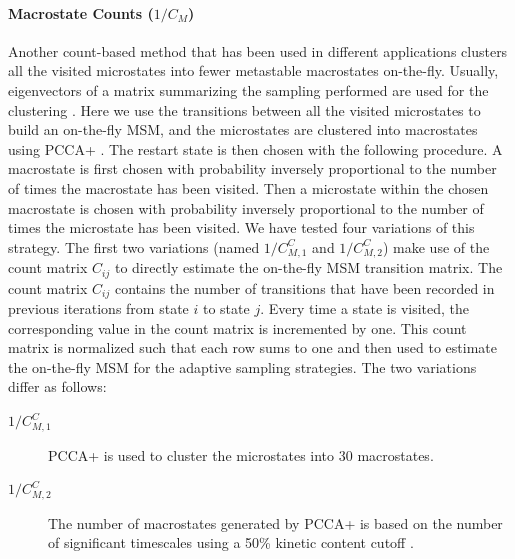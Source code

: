 \paragraph{Macrostate Counts ($1/C_M$)} 
Another count-based method that has been used in different applications clusters all the
visited microstates into fewer metastable macrostates on-the-fly. Usually, eigenvectors of
a matrix summarizing the sampling performed are used for the clustering
\cite{preto2014fast, doerr2016htmd}.  Here we use the transitions between all
the visited microstates to build an on-the-fly MSM, and the microstates are
clustered into macrostates using PCCA+ \cite{roblitz2013fuzzy}. 
The restart state is then chosen with the following procedure. A macrostate
is first chosen with probability inversely proportional to the number of times
the macrostate has been visited. Then a microstate within the chosen macrostate
is chosen with probability inversely proportional to the number of times the
microstate has been visited. We have tested four variations of this strategy.
The first two variations (named $1/C_{M,1}^C$ and $1/C_{M,2}^C$) make use of the count
matrix $C_{ij}$ to directly estimate the on-the-fly MSM transition matrix. The count matrix
$C_{ij}$ contains the number of transitions that have been recorded in previous
iterations from state $i$ to state $j$. Every time a state is visited, the corresponding value
in the count matrix is incremented by one. This count matrix is normalized such
that each row sums to one and then used to estimate the on-the-fly MSM for the
adaptive sampling strategies.
The two variations differ as follows:
\begin{description}
\item[$1/C_{M,1}^C$]
PCCA+ is used to cluster the microstates into 30 macrostates.
\item[$1/C_{M,2}^C$]
The number of macrostates generated by PCCA+ is based on the number of
significant timescales using a 50\% kinetic content cutoff \cite{noe2016commute}.
\end{description}

